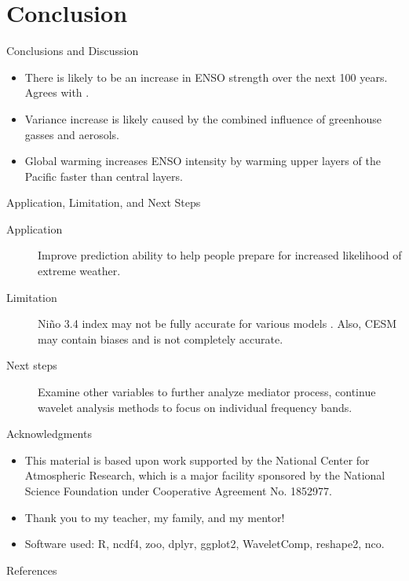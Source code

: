 \documentclass{beamer}
\begin{document}
\section{Conclusion}

\begin{frame}{Conclusions and Discussion}
  \begin{itemize}
  \item There is likely to be an increase in ENSO strength over the next 100 years. Agrees with \citet{cai2018increased}.
  \item Variance increase is likely caused by the combined influence of greenhouse gasses and aerosols.
  \item Global warming increases ENSO intensity by warming upper layers of the Pacific faster than central layers.
  \end{itemize}
\end{frame}

\begin{frame}{Application, Limitation, and Next Steps}
  \begin{description}
  \item[\alert{Application}] Improve prediction ability to help people prepare for increased likelihood of extreme weather.
  \item[\alert{Limitation}] Niño 3.4 index may not be fully accurate for various models \citep{cai2018increased}. Also, CESM may contain biases and is not completely accurate.
  \item[\alert{Next steps}] Examine other variables to further analyze mediator process, continue wavelet analysis methods to focus on individual frequency bands.
  \end{description}
\end{frame}

\begin{frame}{Acknowledgments}
  \begin{itemize}
  \item This material is based upon work supported by the National Center for Atmospheric Research, which is a major facility sponsored by the National Science Foundation under Cooperative Agreement No. 1852977.
  \item Thank you to my teacher, my family, and my mentor!
  \item Software used: R, ncdf4, zoo, dplyr, ggplot2, WaveletComp, reshape2, nco.
  \end{itemize}
\end{frame}

\begin{frame}{References}
  
  \fontsize{4pt}{5}\selectfont
  
\end{frame}
\end{document}
